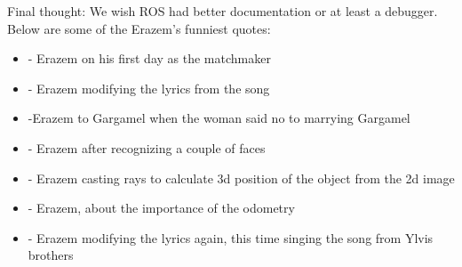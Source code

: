\documentclass[12pt,a4paper]{article}
\begin{document}
	Final thought: We wish ROS had better documentation or at least a debugger. \\


	Below are some of the Erazem's funniest quotes: 
	\begin{itemize}
		\item {} - Erazem on his first day as the matchmaker
		\item {} - Erazem modifying the lyrics from the song
		\item {} -Erazem to Gargamel when the woman said no to marrying Gargamel
		\item {} - Erazem after recognizing a couple of faces
		\item {} - Erazem casting rays to calculate 3d position of the object from the 2d image
		\item {} - Erazem, about the importance of the odometry
		\item {} - Erazem modifying the lyrics again, this time singing the song from Ylvis brothers 
	\end{itemize}
	
\end{document}

